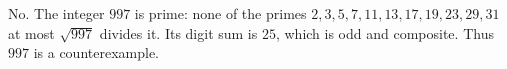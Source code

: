No. The integer $997$ is prime: none of the primes $2,3,5,7,11,13,17,19,23,29,31$ at most $\sqrt{997}$ divides it. Its digit sum is $25$, which is odd and composite. Thus $997$ is a counterexample.
